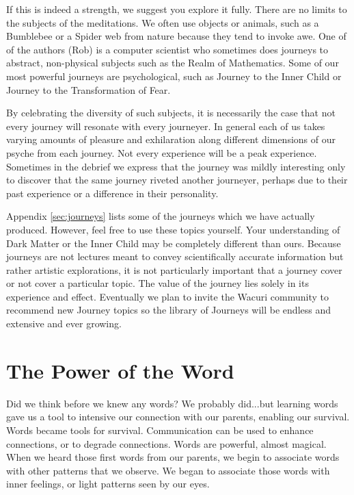 \documentclass[12pt]{book}
\begin{document}
If this is indeed a strength, we suggest you explore it fully. There are no limits to the subjects of the meditations. We often use objects or animals, such as a Bumblebee or a Spider web from nature because they tend to invoke awe. One of of the authors (Rob) is a computer scientist who sometimes does journeys to abstract, non-physical subjects such as the Realm of Mathematics. Some of our most powerful journeys are psychological, such as Journey to the Inner Child or Journey to the Transformation of Fear.
					
By celebrating the diversity of such subjects, it is necessarily the case that not every journey will resonate with every journeyer. In general each of us takes varying amounts of pleasure and exhilaration along different dimensions of our psyche from each journey. Not every experience will be a peak experience. Sometimes in the debrief we express that the journey was mildly interesting only to discover that the same journey riveted another journeyer, perhaps due to their past experience or a difference in their personality.
					



Appendix \ref{sec:journeys} lists some of the journeys which we have actually produced. However, feel free to use these topics yourself. Your understanding of Dark Matter or the Inner Child may be completely different than ours. Because journeys are not lectures meant to convey scientifically accurate information but rather artistic explorations, it is not particularly important that a journey cover or not cover a particular topic. The value of the journey lies solely in its experience and effect.  Eventually we plan to invite the Wacuri community to recommend new Journey topics so the library of Journeys will be endless and extensive and ever growing. 


\chapter{The Power of the Word}

Did we think before we knew any words? We probably did...but learning words gave us a tool to intensive our connection with our parents, enabling our survival. Words became tools for survival. Communication can be used to enhance connections, or to degrade connections. Words are powerful, almost magical. When we heard those first words from our parents, we begin to associate words with other patterns that we observe. We began to associate those words with inner feelings, or light patterns seen by our eyes.
\end{document}
